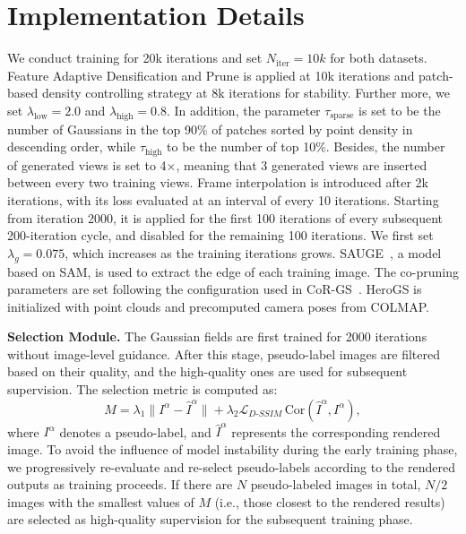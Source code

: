 \clearpage
\setcounter{page}{1}
\maketitlesupplementary
\section{Implementation Details} 

We conduct training for 20k iterations and set \( N_{\mathrm{iter}}=10k\) for both datasets. Feature Adaptive Densification and Prune is applied at 10k iterations and patch-based density controlling strategy at 8k iterations for stability. Further more, we set \( \lambda_{\text{low}} = 2.0 \) and \( \lambda_{\text{high}} = 0.8 \). In addition, the parameter $\tau_{\text{sparse}}$ is set to be the number of Gaussians in the top 90$\%$ of patches sorted by point density in descending order, while $\tau_{\text{high}}$ to be the number of top 10$\%$. Besides, the number of generated views is set to 4×, meaning that 3 generated views are inserted between every two training views. Frame interpolation is introduced after 2k iterations, with its loss evaluated at an interval of every 10 iterations. Starting from iteration 2000, it is applied for the first 100 iterations of every subsequent 200-iteration cycle, and disabled for the remaining 100 iterations. We first set $\lambda_{g}=0.075$, which increases as the training iterations grows. SAUGE~\cite{liufu2025sauge}, a model based on SAM, is used to extract the edge of each training image. The co-pruning parameters are set following the configuration used in CoR-GS~\cite{zhang2024cor}. HeroGS is initialized with point clouds and precomputed camera poses from COLMAP.

\textbf{Selection Module.}
The Gaussian fields are first trained for 2000 iterations without image-level guidance.
After this stage, pseudo-label images are filtered based on their quality, and the high-quality ones are used for subsequent supervision. 
The selection metric is computed as:
\begin{equation}
M = \lambda_1 \| I^{\alpha} - \hat{I}^{\alpha} \| + \lambda_2 \mathcal{L}_{D\text{-}SSIM} \, \mathrm{Cor}(\hat{I}^{\alpha}, I^{\alpha}),
\end{equation}
where $I^{\alpha}$ denotes a pseudo-label, and $\hat{I}^{\alpha}$ represents the corresponding rendered image. 
To avoid the influence of model instability during the early training phase, we progressively re-evaluate and re-select pseudo-labels according to the rendered outputs as training proceeds.
If there are $N$ pseudo-labeled images in total, $N/2$ images with the smallest values of $M$ (i.e., those closest to the rendered results) are selected as high-quality supervision for the subsequent training phase.

